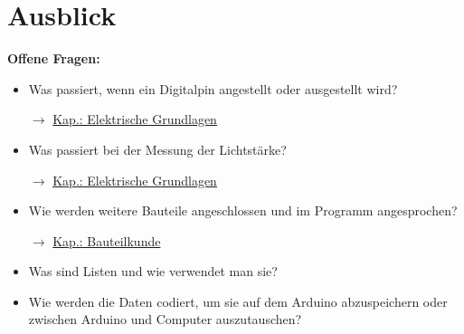 



\newpage
\section{Ausblick}
\label{sec:algo-ausblick}

\begin{ziel}
	\textbf{Offene Fragen:}
	
	\begin{itemize}[itemsep=0ex,parsep=0ex]
		\item Was passiert, wenn ein Digitalpin angestellt oder ausgestellt wird?
		
		$\rightarrow$ \hyperref[kap:elektrischegrundlagen]{Kap.: Elektrische Grundlagen}
		\item Was passiert bei der Messung der Lichtstärke?
		
		$\rightarrow$ \hyperref[kap:elektrischegrundlagen]{Kap.: Elektrische Grundlagen}
		\item Wie werden weitere Bauteile angeschlossen und im Programm angesprochen?
		
		$\rightarrow$ \hyperref[kap:bauteilkunde]{Kap.: Bauteilkunde}
		\item Was sind Listen und wie verwendet man sie?
		\item Wie werden die Daten codiert, um sie auf dem Arduino abzuspeichern oder zwischen Arduino und Computer auszutauschen?
	\end{itemize}
\end{ziel}


%


